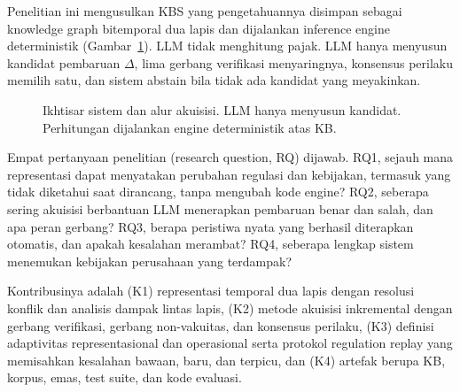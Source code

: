 \documentclass[conference]{IEEEtran}
\makeatletter
\DeclareRobustCommand{\en}[1]{{\usefont{\f@encoding}{\f@family}{\f@series}{it}#1\/}}
\makeatother
\begin{document}
Penelitian ini mengusulkan KBS yang pengetahuannya disimpan sebagai \en{knowledge graph} bitemporal dua lapis dan dijalankan \en{inference engine} deterministik (Gambar~\ref{fig:alur}). LLM tidak menghitung pajak. LLM hanya menyusun kandidat pembaruan $\Delta$, lima gerbang verifikasi menyaringnya, konsensus perilaku memilih satu, dan sistem \en{abstain} bila tidak ada kandidat yang meyakinkan.

\begin{figure}[t]
\centering
{}
\caption{Ikhtisar sistem dan alur akuisisi. LLM hanya menyusun kandidat. Perhitungan dijalankan \en{engine} deterministik atas KB.}
\label{fig:alur}
\end{figure}

Empat pertanyaan penelitian (\en{research question}, RQ) dijawab. RQ1, sejauh mana representasi dapat menyatakan perubahan regulasi dan kebijakan, termasuk yang tidak diketahui saat dirancang, tanpa mengubah kode \en{engine}? RQ2, seberapa sering akuisisi berbantuan LLM menerapkan pembaruan benar dan salah, dan apa peran gerbang? RQ3, berapa peristiwa nyata yang berhasil diterapkan otomatis, dan apakah kesalahan merambat? RQ4, seberapa lengkap sistem menemukan kebijakan perusahaan yang terdampak?

Kontribusinya adalah (K1) representasi temporal dua lapis dengan resolusi konflik dan analisis dampak lintas lapis, (K2) metode akuisisi inkremental dengan gerbang verifikasi, gerbang non-vakuitas, dan konsensus perilaku, (K3) definisi adaptivitas representasional dan operasional serta protokol \en{regulation replay} yang memisahkan kesalahan bawaan, baru, dan terpicu, dan (K4) artefak berupa KB, korpus, emas, \en{test suite}, dan kode evaluasi.
\end{document}
